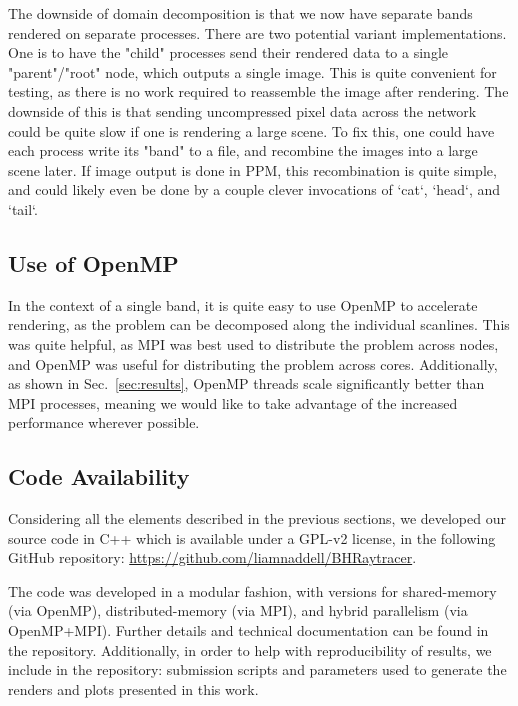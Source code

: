 The downside of domain decomposition is that we now have separate bands rendered on separate processes. There are two potential variant implementations. One is to have the "child" processes send their rendered data to a single "parent"/"root" node, which outputs a single image. This is quite convenient for testing, as there is no work required to reassemble the image after rendering. The downside of this is that sending uncompressed pixel data across the network could be quite slow if one is rendering a large scene. To fix this, one could have each process write its "band" to a file, and recombine the images into a large scene later. If image output is done in PPM, this recombination is quite simple, and could likely even be done by a couple clever invocations of `cat`, `head`, and `tail`.


\subsection{Use of OpenMP}
In the context of a single band, it is quite easy to use OpenMP \cite{660313_OMP} to accelerate rendering, as the problem can be decomposed along the individual scanlines. This was quite helpful, as MPI was best used to distribute the problem across nodes, and OpenMP was useful for distributing the problem across cores.
Additionally, as shown in Sec.~\ref{sec:results}, OpenMP threads scale significantly better than MPI processes, meaning we would like to take advantage of the increased performance wherever possible.


\subsection{Code Availability}
Considering all the elements described in the previous sections, we developed our
source code in C++ which is available under a GPL-v2 license, in the following
GitHub repository:
	\url{https://github.com/liamnaddell/BHRaytracer}.

The code was developed in a modular fashion, with versions
for shared-memory (via OpenMP),
distributed-memory (via MPI), and hybrid parallelism (via OpenMP+MPI).
Further details and technical documentation can be found in the repository.
Additionally, in order to help with reproducibility of results, we include in
the repository: submission scripts and parameters used to
generate the renders and plots presented in this work.




